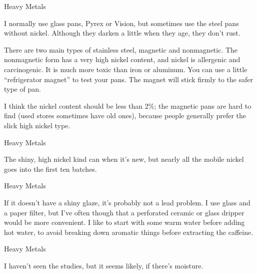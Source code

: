 \documentclass[11pt,oneside,openany,extrafontsizes]{memoir}
\begin{document}
\begin{standalonequote}{Heavy Metals}

    \begin{answer}
		I normally use glass pans, Pyrex or Vision, but sometimes use the steel pans without nickel. Although they darken a little when they age, they don't rust.

		There are two main types of stainless steel, magnetic and nonmagnetic. The nonmagnetic form has a very high nickel content, and nickel is allergenic and carcinogenic. It is much more toxic than iron or aluminum. You can use a little \enquote{refrigerator magnet} to test your pans. The magnet will stick firmly to the safer type of pan.

		I think the nickel content should be less than 2\%; the magnetic pans are hard to find (used stores sometimes have old ones), because people generally prefer the slick high nickel type.
    \end{answer}
\end{standalonequote}

\begin{standalonequote}{Heavy Metals}

    \begin{answer}
      The shiny, high nickel kind can when it's new, but nearly all the mobile nickel goes into the first ten batches.
    \end{answer}
\end{standalonequote}

\begin{standalonequote}{Heavy Metals}

    \begin{answer}
      If it doesn't have a shiny glaze, it's probably not a lead problem. I use glass and a paper filter, but I've often though that a perforated ceramic or glass dripper would be more convenient. I like to start with some warm water before adding hot water, to avoid breaking down aromatic things before extracting the caffeine.
    \end{answer}
\end{standalonequote}

\begin{standalonequote}{Heavy Metals}

    \begin{answer}
      I haven't seen the studies, but it seems likely, if there's moisture.
    \end{answer}
\end{standalonequote}
\end{document}

